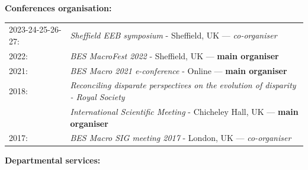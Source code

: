 \documentclass[10pt,a4paper]{article}
\begin{document}
{\bigskip

\raggedright\textbf{Conferences organisation:}\\
\begin{tabular}{ll}
2023-24-25-26-27: & \textit{Sheffield EEB symposium} - Sheffield, UK --- \textit{co-organiser}\\
2022: & \textit{BES MacroFest 2022} - Sheffield, UK --- \textbf{main organiser}\\
2021: & \textit{BES Macro 2021 e-conference} - Online --- \textbf{main organiser}\\
2018: & \textit{Reconciling disparate perspectives on the evolution of disparity - Royal Society}\\
      & \textit{International Scientific Meeting} - Chicheley Hall, UK --- \textbf{main organiser}\\
2017: & \textit{BES Macro SIG meeting 2017} - London, UK --- \textit{co-organiser}\\
\end{tabular}

\bigskip


\raggedright\textbf{Departmental services:}

}
\end{document}
